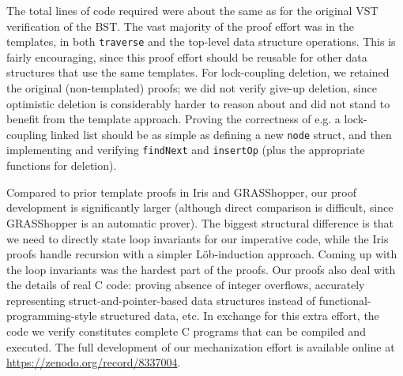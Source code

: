 \documentclass[sigplan,screen]{acmart}
\begin{document}
The total lines of code required were about the same as for the original VST verification of the BST. The vast majority of the proof effort was in the templates, in both \lstinline{traverse} and the top-level data structure operations. This is fairly encouraging, since this proof effort should be reusable for other data structures that use the same templates. For lock-coupling deletion, we retained the original (non-templated) proofs; we did not verify give-up deletion, since optimistic deletion is considerably harder to reason about and did not stand to benefit from the template approach.
Proving the correctness of e.g. a lock-coupling linked list should be as simple as defining a new \lstinline{node} struct, and then implementing and verifying \lstinline{findNext} and \lstinline{insertOp} (plus the appropriate functions for deletion).


Compared to prior template proofs in Iris and GRASShopper, our proof development is significantly larger (although direct comparison is difficult, since GRASShopper is an automatic prover). The biggest structural difference is that we need to directly state loop invariants for our imperative code, while the Iris proofs handle recursion with a simpler Löb-induction approach. Coming up with the loop invariants was the hardest part of the proofs. Our proofs also deal with the details of real C code: proving absence of integer overflows, accurately representing struct-and-pointer-based data structures instead of functional-programming-style structured data, etc. In exchange for this extra effort, the code we verify constitutes complete C programs that can be compiled and executed.
The full development of our mechanization effort is available online at \href{https://zenodo.org/record/8337004}{https://zenodo.org/record/8337004}.
\end{document}
